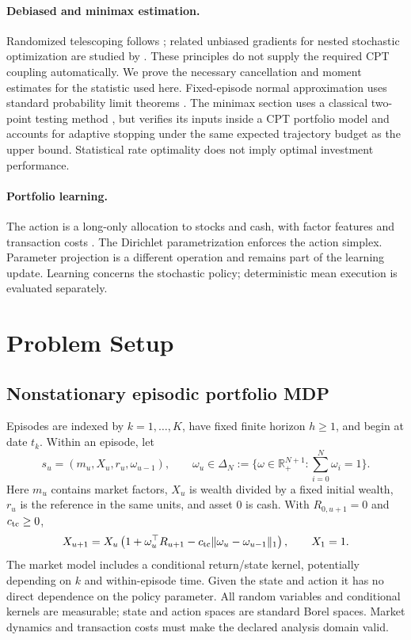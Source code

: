 \documentclass[11pt]{article}
\newcommand{\R}{\mathbb R}
\newcommand{\1}{\mathbf 1}
\DeclarePairedDelimiter{\norm}{\lVert}{\rVert}
\theoremstyle{definition}
\begin{document}
\paragraph{Debiased and minimax estimation.}
Randomized telescoping follows \citet{rhee2015unbiased}; related unbiased gradients for nested stochastic optimization are studied by \citet{goda2023unbiased}. These principles do not supply the required CPT coupling automatically. We prove the necessary cancellation and moment estimates for the statistic used here. Fixed-episode normal approximation uses standard probability limit theorems \citep{vandervaart1998asymptotic}. The minimax section uses a classical two-point testing method \citep{tsybakov2009introduction}, but verifies its inputs inside a CPT portfolio model and accounts for adaptive stopping under the same expected trajectory budget as the upper bound. Statistical rate optimality does not imply optimal investment performance.

\paragraph{Portfolio learning.}
The action is a long-only allocation to stocks and cash, with factor features and transaction costs \citep{markowitz1952portfolio,fama1993common}. The Dirichlet parametrization enforces the action simplex. Parameter projection is a different operation and remains part of the learning update. Learning concerns the stochastic policy; deterministic mean execution is evaluated separately.

\section{Problem Setup}\label{sec:setup}
\subsection{Nonstationary episodic portfolio MDP}
Episodes are indexed by $k=1,\ldots,K$, have fixed finite horizon $h\ge1$, and begin at date $t_k$. Within an episode, let
\[
 s_u=(m_u,X_u,r_u,\omega_{u-1}),\qquad
 \omega_u\in\Delta_N:=\{\omega\in\R_+^{N+1}:\textstyle\sum_{i=0}^N\omega_i=1\}.
\]
Here $m_u$ contains market factors, $X_u$ is wealth divided by a fixed initial wealth, $r_u$ is the reference in the same units, and asset $0$ is cash. With $R_{0,u+1}=0$ and $c_{\rm tc}\ge0$,
\begin{equation}\label{eq:wealth-update}
 X_{u+1}=X_u\left(1+\omega_u^\top R_{u+1}
 -c_{\rm tc}\norm{\omega_u-\omega_{u-1}}_1\right),\qquad X_1=1.
\end{equation}
The market model includes a conditional return/state kernel, potentially depending on $k$ and within-episode time. Given the state and action it has no direct dependence on the policy parameter. All random variables and conditional kernels are measurable; state and action spaces are standard Borel spaces. Market dynamics and transaction costs must make the declared analysis domain valid.
\end{document}
